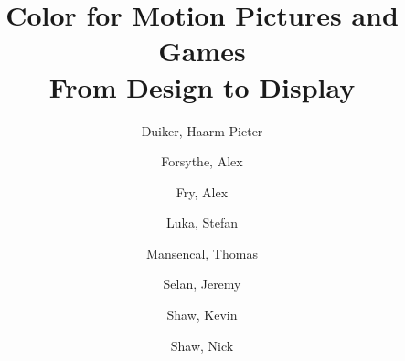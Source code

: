 \title{
    \LARGE{Color for Motion Pictures and Games}\\
    \vspace{5mm}
    \large{From Design to Display}
}

\author{
    Duiker, Haarm-Pieter\\
    \and
    Forsythe, Alex\\
    \and
    Fry, Alex\\
    \and
    Luka, Stefan\\
    \and
    Mansencal, Thomas\\
    \and
    Selan, Jeremy\\
    \and
    Shaw, Kevin\\
    \and
    Shaw, Nick\\
}

\date{}
